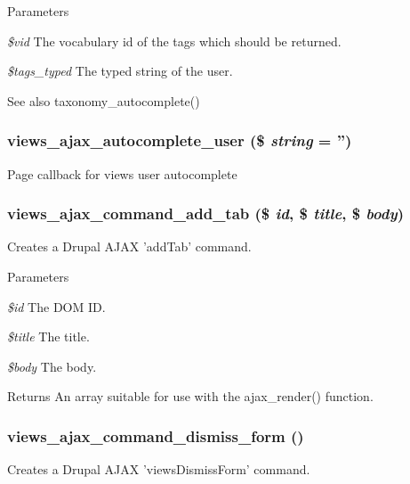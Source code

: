 \begin{DoxyParams}{Parameters}
\item[{\em \$vid}]The vocabulary id of the tags which should be returned.\item[{\em \$tags\_\-typed}]The typed string of the user.\end{DoxyParams}
\begin{DoxySeeAlso}{See also}
taxonomy\_\-autocomplete() 
\end{DoxySeeAlso}
\hypertarget{group__ajax_ga0d9404f1a04f9f5102ffac0bef92d5ab}{
\subsubsection[{views\_\-ajax\_\-autocomplete\_\-user}]{\setlength{\rightskip}{0pt plus 5cm}views\_\-ajax\_\-autocomplete\_\-user (\$ {\em string} = {\ttfamily ''})}}
\label{group__ajax_ga0d9404f1a04f9f5102ffac0bef92d5ab}
Page callback for views user autocomplete \hypertarget{group__ajax_ga9e55776de616656e252b0f9eb8851e82}{
\subsubsection[{views\_\-ajax\_\-command\_\-add\_\-tab}]{\setlength{\rightskip}{0pt plus 5cm}views\_\-ajax\_\-command\_\-add\_\-tab (\$ {\em id}, \/  \$ {\em title}, \/  \$ {\em body})}}
\label{group__ajax_ga9e55776de616656e252b0f9eb8851e82}
Creates a Drupal AJAX 'addTab' command.


\begin{DoxyParams}{Parameters}
\item[{\em \$id}]The DOM ID. \item[{\em \$title}]The title. \item[{\em \$body}]The body.\end{DoxyParams}
\begin{DoxyReturn}{Returns}
An array suitable for use with the ajax\_\-render() function. 
\end{DoxyReturn}
\hypertarget{group__ajax_gac0331ece9a64afe1350f116b9c5a79f1}{
\subsubsection[{views\_\-ajax\_\-command\_\-dismiss\_\-form}]{\setlength{\rightskip}{0pt plus 5cm}views\_\-ajax\_\-command\_\-dismiss\_\-form ()}}
\label{group__ajax_gac0331ece9a64afe1350f116b9c5a79f1}
Creates a Drupal AJAX 'viewsDismissForm' command.

